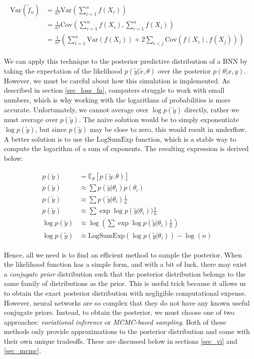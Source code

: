 \documentclass[12pt]{article}
\begin{document}
{\begin{align}
\begin{split}
\text{Var} \left( \tilde{f}_n \right) &= \frac{1}{n^2} \text{Var} \left( \sum_{i=1}^n f(X_i)\right) \\
&= \frac{1}{n^2} \text{Cov} \left( \sum_{i=1}^n f\left(X_{i}\right), \sum_{i=1}^{n} f(X_{i})\right) \\
&=\frac{1}{n^2} \left (\sum_{i=1}^n \text{Var}(f(X_{i}))+2 \sum_{i<j} \text{Cov}(f(X_{i}), f(X_{j}))\right)
\end{split}
\label{eq_mc_var}
\end{align}

We can apply this technique to the posterior predictive distribution of a BNN by taking the expectation of the likelihood $p(\tilde{y}|\tilde{x},\theta)$ over the posterior $p(\theta|x,y)$. However, we must be careful about how this simulation is implemented. As described in section \ref{sec_loss_fn}, computers struggle to work with small numbers, which is why working with the logarithms of probabilities is more accurate. Unfortunately, we cannot average over $\log p(\tilde{y})$ directly, rather we must average over $p(\tilde{y})$. The naive solution would be to simply exponentiate $\log p(\tilde{y})$, but since $p(\tilde{y})$ may be close to zero, this would result in underflow. A better solution is to use the $\textrm{LogSumExp}$ function, which is a stable way to compute the logarithm of a sum of exponents. The resulting expression is derived below:

\begin{align}
\begin{split}
p(\tilde{y}) &= \mathbb{E}_\theta [p(\tilde{y}, \theta)] \\
p(\tilde{y}) &\approx \sum p(\tilde{y}|\theta_i) p(\theta_i) \\
p(\tilde{y}) &\approx \sum p(\tilde{y}|\theta_i) \frac{1}{n} \\
p(\tilde{y}) &\approx \sum \exp \log p(\tilde{y}|\theta_i)) \frac{1}{n} \\
\log p(\tilde{y}) &\approx \log(\sum \exp \log p(\tilde{y}|\theta_i) \frac{1}{n}) \\
\log p(\tilde{y}) &\approx \textrm{LogSumExp} (\log p(\tilde{y}|\theta_i)) - \log(n)
\end{split}
\end{align}

Hence, all we need is to find an efficient method to sample the posterior. When the likelihood function has a simple form, and with a bit of luck, there may exist a \textit{conjugate prior} distribution such that the posterior distribution belongs to the same family of distributions as the prior. This is useful trick because it allows us to obtain the exact posterior distribution with negligible computational expense. However, neural networks are so complex that they do not have any known useful conjugate priors. Instead, to obtain the posterior, we must choose one of two approaches: \textit{variational inference} or \textit{MCMC-based sampling}. Both of these methods only provide approximations to the posterior distribution and come with their own unique tradeoffs. These are discussed below in sections \ref{sec_vi} and \ref{sec_mcmc}.

}
\end{document}
